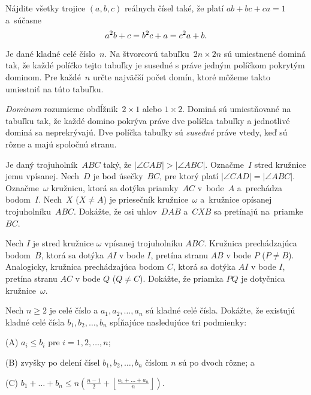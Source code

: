 {%
Nájdite všetky trojice $(a, b, c)$ reálnych čísel také, že platí $ab + bc + ca = 1$ a~súčasne
$$
a^2b + c = b^2c + a = c^2a + b.
\belowdisplayskip0pt
$$}

{%
Je dané kladné celé číslo~$n$. Na štvorcovú tabuľku~$2n\times 2n$ sú umiestnené dominá tak,
že každé políčko tejto tabuľky je susedné s práve jedným políčkom pokrytým dominom. Pre každé~$n$
určte najväčší počet domín, ktoré môžeme takto umiestniť na túto tabuľku.

\poznamka
\emph{Dominom} rozumieme obdĺžnik~$2 \times 1$ alebo $1 \times 2$. Dominá sú umiestňované na tabuľku tak, že
každé domino pokrýva práve dve políčka tabuľky a jednotlivé dominá sa neprekrývajú. Dve políčka
tabuľky sú \emph{susedné} práve vtedy, keď sú rôzne a majú spoločnú stranu.}

{%
Je daný trojuholník~$ABC$ taký, že $|\angle CAB| > |\angle ABC|$. Označme~$I$ stred kružnice jemu
vpísanej. Nech~$D$ je bod úsečky~$BC$, pre ktorý platí $|\angle CAD|= |\angle ABC|$. Označme~$\omega$ kružnicu, ktorá sa dotýka priamky~$AC$ v~bode~$A$ a~prechádza bodom~$I$. Nech~$X$ ($X \ne A$) je priesečník kružnice~$\omega$ a~kružnice opísanej trojuholníku~$ABC$. Dokážte, že osi uhlov~$DAB$ a~$CXB$ sa pretínajú na~priamke~$BC$.}

{%
Nech $I$ je stred kružnice $\omega$ vpísanej trojuholníku $ABC$. Kružnica prechádzajúca bodom~$B$,
ktorá sa dotýka $AI$ v bode $I$, pretína stranu $AB$ v bode $P$ ($P \ne B$). Analogicky, kružnica prechádzajúca bodom $C$, ktorá sa dotýka $AI$ v bode $I$, pretína stranu $AC$ v bode $Q$ ($Q \ne C$). Dokážte, že
priamka $PQ$ je dotyčnica kružnice~$\omega$.}

{%
Nech $n \geq 2$ je celé číslo a $a_1, a_2, \ldots , a_n$ sú kladné celé čísla. Dokážte, že existujú kladné
celé čísla $b_1, b_2, \ldots , b_n$ spĺňajúce nasledujúce tri podmienky:
\item{(A)} $a_i \leq b_i$ pre $i = 1, 2, \ldots , n$;
\item{(B)} zvyšky po delení čísel $b_1, b_2, \ldots , b_n$ číslom $n$ sú po dvoch rôzne; a
\item{(C)} $\displaystyle b_1 + \ldots + b_n \leq n\left(\frac{n-1}2 + \left\lfloor \frac{a_1+\ldots+a_n}{n}\right\rfloor\right).$
}

